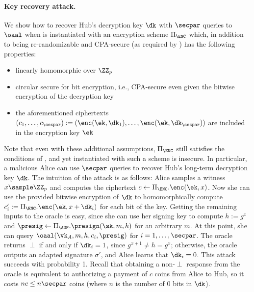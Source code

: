 \paragraph{Key recovery attack.} We show how to recover Hub's decryption key $\dk$ with $\secpar$ queries to $\oaal$ when \AAL is instantiated with an encryption scheme $\Pi_\ENC$ which, in addition to being re-randomizable and CPA-secure (as required by ) has the following properties:
\begin{itemize}
    \item linearly homomorphic over $\ZZ_p$
    \item circular secure for bit encryption, i.e., CPA-secure even given the bitwise encryption of the decryption key
    \item the aforementioned ciphertexts $(c_1, \dots, c_\secpar) := (\enc(\ek, \dk_1), \dots, \enc(\ek,\allowbreak \dk_\secpar))$ are included in the encryption key $\ek$
\end{itemize}

Note that even with these additional assumptions, $\Pi_\ENC$ still satisfies the conditions of , and yet \AAL instantiated with such a scheme is insecure. In particular, a malicious Alice can use $\secpar$ queries to recover Hub's long-term decryption key $\dk$. The intuition of the attack is as follows: Alice samples a witness $x \sample \ZZ_p$ and computes the ciphertext $c \gets \Pi_\ENC.\enc(\ek, x)$. Now she can use the provided bitwise encryption of $\dk$ to homomorphically compute $c_i' := \Pi_\ENC.\enc(\ek, x + \dk_i)$ for each bit of the key. Getting the remaining inputs to the oracle is easy, since she can use her signing key to compute $h := g^x$ and $\presig \gets \Pi_\ADP.\presign(\sk, m, h)$ for an arbitrary $m$. At this point, she can query $\oaal(\vk_A, m, h, c_i, \presig)$ for $i = 1, \dots, \secpar$. The oracle returns $\perp$ if and only if $\dk_i = 1$, since $g^{x+1} \neq h = g^x$; otherwise, the oracle outputs an adapted signature $\sigma'$, and Alice learns that $\dk_i = 0$. This attack succeeds with probability 1. Recall that obtaining a non-$\perp$ response from the oracle is equivalent to authorizing a payment of $c$ coins from Alice to Hub, so it costs $nc \leq n\secpar$ coins (where $n$ is the number of 0 bits in $\dk$).

